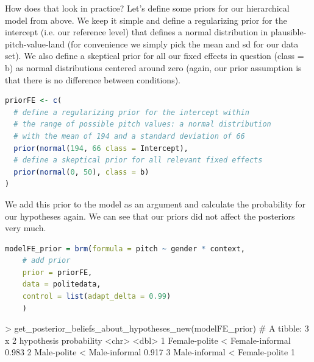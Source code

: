 \documentclass[nobib]{tufte-handout}
\begin{document}
How does that look in practice? Let's define some priors for our hierarchical model from above. We keep it simple and define a regularizing prior for the intercept (i.e. our reference level) that defines a normal distribution in plausible-pitch-value-land (for convenience we simply pick the mean and sd for our data set). We also define a skeptical prior for all our fixed effects in question (class = b) as normal distributions centered around zero (again, our prior assumption is that there is no difference between conditions).  


\bigskip

\begin{minipage}[]{1\textwidth}
\begin{lstlisting}[language=R]
priorFE <- c(
  # define a regularizing prior for the intercept within 
  # the range of possible pitch values: a normal distribution 
  # with the mean of 194 and a standard deviation of 66
  prior(normal(194, 66 class = Intercept),
  # define a skeptical prior for all relevant fixed effects
  prior(normal(0, 50), class = b)
)
\end{lstlisting}
\end{minipage}

We add this prior to the model as an argument and calculate the probability for our hypotheses again. We can see that our priors did not affect the posteriors very much.

\bigskip

\begin{minipage}[]{1\textwidth}
\begin{lstlisting}[language=R]
modelFE_prior = brm(formula = pitch ~ gender * context,
	# add prior 
	prior = priorFE,
	data = politedata,
	control = list(adapt_delta = 0.99)
	)    
\end{lstlisting}
\end{minipage}

\begin{minipage}[]{\textwidth}
\begin{rc}
> get_posterior_beliefs_about_hypotheses_new(modelFE_prior)
# A tibble: 3 x 2
  hypothesis                      probability
  <chr>                                 <dbl>
1 Female-polite < Female-informal       0.983
2 Male-polite < Male-informal           0.917
3 Male-informal < Female-polite         1  
\end{rc}
\end{minipage}
\end{document}
